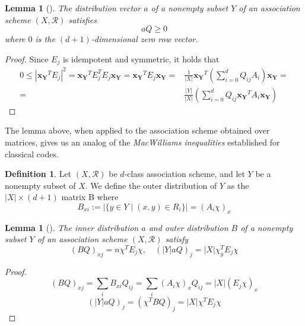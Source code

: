 \documentclass[a4paper,12pt]{article}
\theoremstyle{plain}
\newtheorem{lemma}[theorem]{Lemma}
\theoremstyle{definition}
\newtheorem{definition}[theorem]{Definition}
\theoremstyle{remark}
\begin{document}
\begin{lemma}[{\parencite[Theorem 30.3]{van_lint_course_2001}}]
    The distribution vector $ a $ of a nonempty subset $ Y $ of an association
    scheme $ (X,\mathcal{R}) $ satisfies
    \[ aQ \geq 0 \]
    where $ 0 $ is the $ (d+1) $-dimensional zero row vector.
\end{lemma}
\begin{proof}
    Since $ E_j $ is idempotent and symmetric, it holds that
    \begin{equation*}
        \begin{split}
        0 \leq |\boldsymbol{x_Y}^TE_j|^2 = \boldsymbol{x_Y}^T E_j^T E_j \boldsymbol{x_Y} = \boldsymbol{x_Y}^T E_j \boldsymbol{x_Y}
        =& \frac{1}{|X|}\boldsymbol{x_Y}^T(\sum_{ i=0 }^{ d }Q_{ij}A_i)\boldsymbol{x_Y} = \\
        =& \frac{|Y|}{|X|}(\sum_{ i=0 }^{ d }Q_{ij}\boldsymbol{x_Y}^TA_i\boldsymbol{x_Y})
        \end{split}
    \end{equation*}
\end{proof}

The lemma above, when applied to the association scheme obtained over matrices,
gives us an analog of the \textit{MacWilliams inequalities} established for
classical codes.

\begin{definition}
    Let $ (X,\mathcal{R}) $ be $ d $-class association scheme, and let $ Y $
    be a nonempty subset of $ X $. We define the outer distribution of $ Y $
    as the $ |X|\times(d+1) $ matrix B where
    \[ B_{xi} := |\{ y \in Y \mid (x,y) \in R_i \} | = (A_i\chi)_x \]
\end{definition}

\begin{lemma}[{\parencite[Lemma 2.5.1]{brouwer_distance-regular_1989}}]
    The inner distribution $ a $ and outer distribution $ B $ of a nonempty
    subset $ Y $ of an association scheme $ (X,\mathcal{R}) $ satisfy
    \[ (BQ)_{xj} = n\chi^TE_j\chi, \quad (|Y|aQ)_j = |X|\chi_y^TE_j\chi \]
    \label{lm:in_out_dist}
\end{lemma}
\begin{proof}
    \begin{equation*}
        (BQ)_{xj} = \sum_{ i } B_{xi}Q_{ij} = \sum_{ i } (A_i\chi)_xQ_{ij} =
        |X|(E_j\chi)_x
    \end{equation*}
    \begin{equation*}
        (|Y|aQ)_j = (\chi^TBQ)_j = |X|\chi^TE_j\chi
    \end{equation*}
\end{proof}
\end{document}
